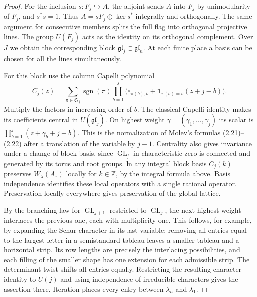\documentclass[a4paper,11pt]{article}
\theoremstyle{definition}
\theoremstyle{remark}
\newcommand{\ZZ}{\mathbb Z}\newcommand{\ord}{\operatorname{ord}}
\numberwithin{equation}{section}
\newcommand{\GL}{\operatorname{GL}}
\begin{document}
\begin{proof}
For the inclusion \(s:F_j\hookrightarrow A\), the adjoint sends \(A\) into \(F_j\) by unimodularity of \(F_j\), and \(s^*s=1\). Thus \(A=sF_j\oplus\ker s^*\) integrally and orthogonally. The same argument for consecutive members splits the full flag into orthogonal projective lines. The group \(U(F_j)\) acts as the identity on its orthogonal complement. Over \(J\) we obtain the corresponding block \(\mathfrak{gl}_j\subset\mathfrak{gl}_n\). At each finite place a basis can be chosen for all the lines simultaneously.

For this block use the column Capelli polynomial
\[
 C_j(z)=\sum_{\pi\in\mathfrak S_j}\operatorname{sgn}(\pi)
       \prod_{b=1}^{j}\big(e_{\pi(b),b}
                    +\mathbf1_{\pi(b)=b}(z+j-b)\big).
\]
Multiply the factors in increasing order of \(b\). The classical Capelli identity makes its coefficients central in \(U(\mathfrak{gl}_j)\). On highest weight \(\gamma=(\gamma_1,\ldots,\gamma_j)\) its scalar is \(\prod_{b=1}^j(z+\gamma_b+j-b)\). This is the normalization of Molev's formulas (2.21)--(2.22) after a translation of the variable by \(j-1\). Centrality also gives invariance under a change of block basis, since \(\GL_j\) in characteristic zero is connected and generated by its torus and root groups. In any integral block basis \(C_j(k)\) preserves \(W_\lambda(A_\tau)\) locally for \(k\in\ZZ\), by the integral formula above. Basis independence identifies these local operators with a single rational operator. Preservation locally everywhere gives preservation of the global lattice.~\cite[Sec.~2]{XIV-XI-IV-molev}

By the branching law for \(\GL_{j+1}\) restricted to \(\GL_j\), the next highest weight interlaces the previous one, each with multiplicity one. This follows, for example, by expanding the Schur character in its last variable: removing all entries equal to the largest letter in a semistandard tableau leaves a smaller tableau and a horizontal strip. Its row lengths are precisely the interlacing possibilities, and each filling of the smaller shape has one extension for each admissible strip. The determinant twist shifts all entries equally. Restricting the resulting character identity to \(U(j)\) and using independence of irreducible characters gives the assertion there. Iteration places every entry between \(\lambda_n\) and \(\lambda_1\).


\end{proof}
\end{document}
